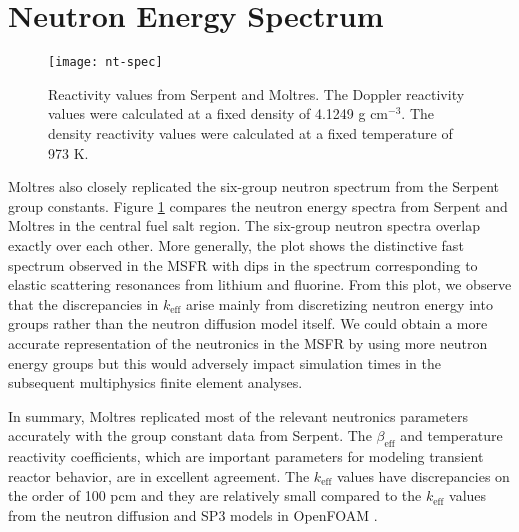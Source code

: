 \section{Neutron Energy Spectrum}

\begin{figure}[htb!]
    \centering
    \texttt{[image: nt-spec]}
    \caption{Reactivity values from Serpent and Moltres. The Doppler
    reactivity values were calculated at a fixed density of 4.1249 g
    cm$^{-3}$. The density reactivity values were calculated at a fixed
    temperature of 973 K.}
    \label{fig:ntspec}
\end{figure}

Moltres also closely replicated the six-group neutron spectrum from the
Serpent group constants. Figure \ref{fig:ntspec} compares the neutron energy
spectra from Serpent and Moltres in the central fuel salt region. The
six-group neutron spectra overlap exactly over each other. More generally, the
plot shows the distinctive fast spectrum observed in the \gls{MSFR} with dips
in the spectrum corresponding to elastic scattering resonances from lithium
and fluorine. From this plot, we observe that the discrepancies in
$k_{\text{eff}}$ arise mainly from discretizing neutron energy into groups
rather than the neutron diffusion model itself. We could obtain a more
accurate representation of the neutronics in the \gls{MSFR} by using more
neutron energy groups but this would adversely impact simulation times in the
subsequent multiphysics finite element analyses.

In summary, Moltres replicated most of the relevant neutronics parameters
accurately with the group constant data from Serpent. The $\beta_{\text{eff}}$
and temperature reactivity coefficients, which are important
parameters for modeling transient reactor behavior, are in excellent
agreement. The $k_{\text{eff}}$ values have discrepancies on the order of 100
pcm and they are relatively small compared to the $k_{\text{eff}}$ values from
the neutron diffusion and SP3 models in OpenFOAM
\cite{cervi_development_2019}.
